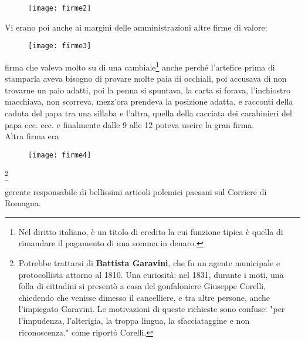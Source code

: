 \begin{figure}[htb]
    \centering
    \vspace{-0.65cm}
    \texttt{[image: firme2]}
    \caption*{\label{fig:firme2}}
    \vspace{-0.3cm}
\end{figure}

\normalfont
\vspace{2cm}

\indent Vi erano poi anche ai margini delle amministrazioni altre firme di valore:
	
	\begin{figure}[htb]
	    \centering
	    \vspace{-0.4cm}
	    \texttt{[image: firme3]}
	    \caption*{\label{fig:firme3}}
	    \vspace{-0.7cm}
	\end{figure}
	

firma che valeva molto su di una cambiale\footnote{Nel diritto italiano, è un titolo di credito la cui funzione tipica è quella di rimandare il pagamento di una somma in denaro.} anche perché l'artefice prima di stamparla aveva bisogno di provare molte paia di occhiali, poi accusava di non trovarne un paio adatti, poi la penna si spuntava, la carta si forava, l'inchiostro macchiava, non scorreva, mezz'ora prendeva la posizione adatta, e racconti della caduta del papa tra una sillaba e l'altra, quella della cacciata dei carabinieri del papa ecc. ecc. e finalmente dalle 9 alle 12 poteva uscire la gran firma. \\

\indent Altra firma era

	\begin{figure}[htb]
	    \centering
	    \vspace{-0.3cm}
	    \texttt{[image: firme4]}
	    
	    \caption*{\label{fig:firme4}}
	    \vspace{-1.6cm}
	\end{figure}\footnote{Potrebbe trattarsi di \textbf{Battista Garavini}, che fu un agente municipale  e protocollista attorno al 1810. Una curiosità: nel 1831, durante i moti, una folla di cittadini si presentò a casa del gonfaloniere Giuseppe Corelli, chiedendo che venisse dimesso il cancelliere,  e tra altre persone, anche l'impiegato Garavini. Le motivazioni di queste richieste sono confuse: "per l'impudenza, l'alterigia, la troppa lingua, la sfacciataggine e non riconoscenza." come riportò Corelli.}

	
\indent gerente responsabile di bellissimi articoli polemici paesani sul Corriere di Romagna.



